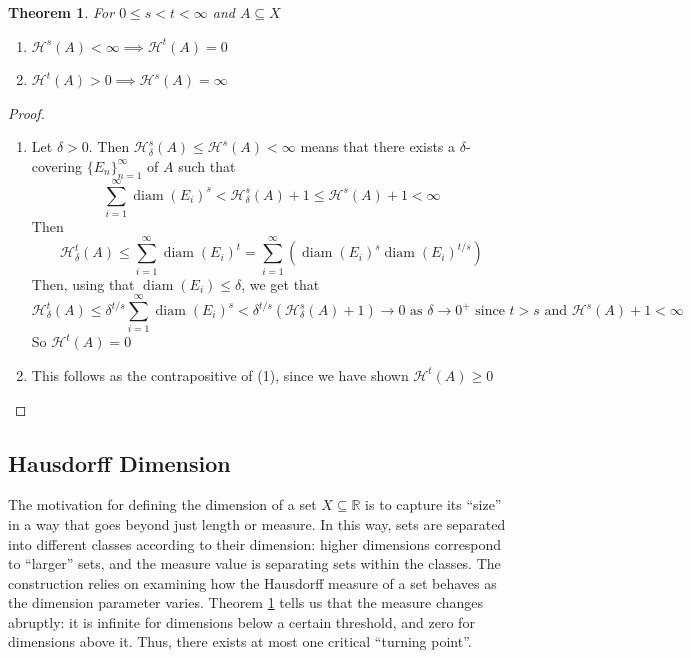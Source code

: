 \documentclass{article}
\theoremstyle{plain}
\newtheorem{thm}{Theorem}[section]
\theoremstyle{definition}
\DeclareMathOperator{\diam}{diam}
\theoremstyle{remark}
\begin{document}
\begin{thm}\label{thm:why_dimension} For $0 \le s<t<\infty$ and $A \subseteq X$ \begin{enumerate} \item $\mathcal{H}^s(A) < \infty \implies \mathcal{H}^t(A) = 0$ \item $\mathcal{H}^t(A)>0 \implies \mathcal{H}^s(A)=\infty$ \end{enumerate} \end{thm}
\begin{proof} $ $
\begin{enumerate}
    \item Let $\delta >0$. Then $\mathcal{H}^s_\delta (A) \le \mathcal{H}^s (A) < \infty$ means that there exists a $\delta$-covering $\{E_n\}_{n =1}^\infty $ of $A$ such that \[\sum \limits _{i=1}^\infty\diam (E_i)^s <\mathcal{H}^s_\delta (A)+1 \le \mathcal{H}^s(A)+1<\infty\] Then \[\mathcal{H}_\delta ^t(A) \le \sum \limits _{i =1}^\infty \diam (E_i)^t = \sum \limits _{i =1}^\infty (\diam (E_i)^s \diam (E_i)^{t/s}) \]Then, using that $\diam (E_i) \le \delta$, we get that \[
    \mathcal{H}^t_\delta (A) \le \delta ^{t/s} \sum \limits _{i = 1}^\infty \diam(E_i)^s <\delta ^{t/s}(\mathcal{H}_\delta ^s(A)+1) \to 0\text{ as } \delta \to 0^+ \text{ since }t > s \text{ and }\mathcal{H}^s(A) + 1 < \infty
    \] So $\mathcal{H}^t(A)=0$
    \item This follows as the contrapositive of (1), since we have shown $\mathcal{H}^t(A)\ge 0$
\end{enumerate}

\end{proof}


\subsection{Hausdorff Dimension}
The motivation for defining the dimension of a set \(X \subseteq \mathbb{R}\) is to capture its ``size'' in a way that goes beyond just length or measure. In this way, sets are separated into different classes according to their dimension: higher dimensions correspond to ``larger'' sets, and the measure value is separating sets within the classes. The construction relies on examining how the Hausdorff measure of a set behaves as the dimension parameter varies. Theorem \ref{thm:why_dimension} tells us that the measure changes abruptly: it is infinite for dimensions below a certain threshold, and zero for dimensions above it. Thus, there exists at most one critical ``turning point''.
\end{document}
